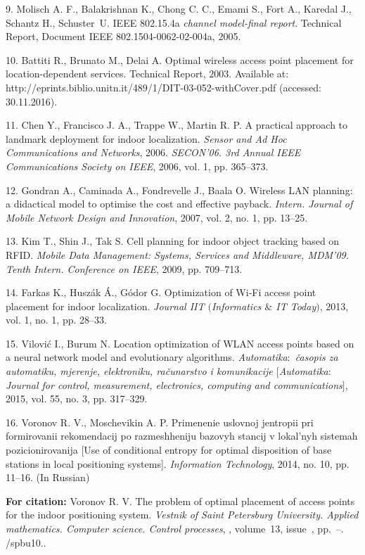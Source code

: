 {9. Molisch A. F., Balakrishnan K., Chong C. C., Emami S., Fort A.,
Karedal J., Schantz H., Schuster~U. IEEE 802.15.4a {\it channel
model-final report}. Technical Report, Document IEEE
802.1504-0062-02-004a, 2005.

10. Battiti R., Brunato M., Delai A. Optimal wireless access point
placement for location-dependent services. Technical Report, 2003.
 Available at:
http://eprints.\-biblio.\-unitn.it/489/1/DIT-03-052-withCover.pdf
(accessed: 30.11.2016).

11. Chen Y., Francisco J. A., Trappe W., Martin R. P. A practical
approach to landmark deployment for indoor localization. {\it
Sensor and Ad Hoc Communications and Networks}, 2006. {\it
SECON'06. 3rd Annual IEEE Communications Society on IEEE}, 2006,
vol. 1, pp. 365--373.

12. Gondran A., Caminada A., Fondrevelle J., Baala O. Wireless LAN
planning: a didactical model to optimise the cost and effective
payback. {\it Intern. Journal of Mobile Network Design and
Innovation}, 2007, vol. 2, no. 1, pp. 13--25.

13. Kim T., Shin J., Tak S. Cell planning for indoor object
tracking based on RFID. {\it Mobile Data Management: Systems,
Services and Middleware, MDM'09. Tenth Intern. Conference on
IEEE}, 2009, pp. 709--713.

14. Farkas K., Husz{\'a}k {\'A}., G{\'o}dor G. Optimization of
Wi-Fi access point placement for indoor localization. {\it Journal
IIT $($Informatics $\&$ IT Today$)$}, 2013, vol. 1,  no. 1, pp.
28--33.

15. Vilovi\'c I., Burum N. Location optimization of WLAN access
points based on a neural network model and evolutionary
algorithms. {\it Automatika$:$ \v{c}asopis za automatiku,
mjerenje, elektroniku, ra\v{c}unarstvo i komunikacije
$[$Automatika$:$ Journal for control, measurement, electronics,
computing and communications$]$}, 2015, vol. 55, no. 3, pp.
317--329.

16. Voronov R. V., Moschevikin A. P. Primenenie uslovnoj jentropii
pri formirovanii rekomendacij po razmeshheniju bazovyh stancij v
lokal'nyh sistemah pozicionirovanija [Use of conditional entropy
for optimal disposition of base stations in local positioning
systems]. {\it Information Technology}, 2014, no. 10, pp. 11--16.
(In Russian)



\vskip 2mm

{\bf For citation:}  Voronov R. V. The problem of  optimal
placement of access points for the indoor positioning system. {\it
Vestnik of Saint Petersburg University. Applied mathematics.
Computer science. Control processes}, \issueyear, volume~13,
issue~\issuenum, pp.~\pageref{p6}--\pageref{p6e}.
\doivyp/spbu10.\issueyear.


}
